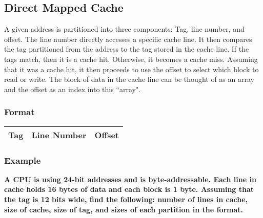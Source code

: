 \documentclass[11pt]{article}
\begin{document}
\subsection{Direct Mapped Cache}

A given address is partitioned into three components: Tag, line number, and offset. The line number directly accesses a specific cache line. It then compares the tag partitioned from the address to the tag stored in the cache line. If the tags match, then it is a cache hit. Otherwise, it becomes a cache miss. Assuming that it was a cache hit, it then proceeds to use the offset to select which block to read or write. The block of data in the cache line can be thought of as an array and the offset as an index into this ``array".

\subsubsection{Format}

\begin{table}[H]
	\centering
	\begin{tabular}{| c | c | c |}
		\hline
		Tag		&	Line Number		&		 Offset\\
		\hline
	\end{tabular}
\end{table}

\subsubsection{Example}

\textbf{A CPU is using 24-bit addresses and is byte-addressable. Each line in cache holds 16 bytes of data and each block is 1 byte. Assuming that the tag is 12 bits wide, find the following: number of lines in cache, size of cache, size of tag, and sizes of each partition in the format.}
\end{document}
